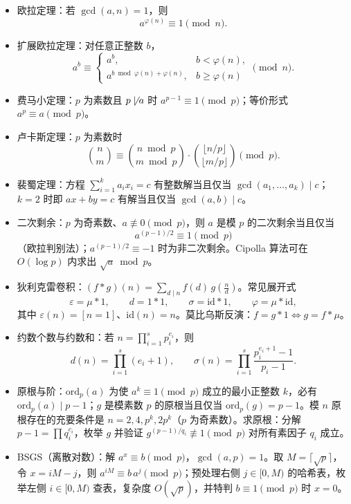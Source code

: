 \documentclass[11pt,a4paper]{ctexart}
\begin{document}
\begin{itemize}
  \item 欧拉定理：若 $\gcd(a,n)=1$，则
  \[a^{\varphi(n)}\equiv 1\pmod n.\]
  \item 扩展欧拉定理：对任意正整数 $b$，
  \[
  a^b\equiv
  \begin{cases}
    a^b, & b<\varphi(n),\\
    a^{b\bmod\varphi(n)+\varphi(n)}, & b\ge\varphi(n)
  \end{cases}
  \pmod n.
  \]
  \item 费马小定理：$p$ 为素数且 $p\not\mid a$ 时 $a^{p-1}\equiv 1\pmod p$；等价形式 $a^p\equiv a\pmod p$。
  \item 卢卡斯定理：$p$ 为素数时
  \[
  \binom{n}{m}\equiv\binom{n\bmod p}{m\bmod p}\cdot\binom{\lfloor n/p\rfloor}{\lfloor m/p\rfloor}\pmod p.
  \]
  \item 裴蜀定理：方程 $\sum_{i=1}^{k}a_ix_i=c$ 有整数解当且仅当 $\gcd(a_1,\dots,a_k)\mid c$；$k=2$ 时即 $ax+by=c$ 有解当且仅当 $\gcd(a,b)\mid c$。
  \item 二次剩余：$p$ 为奇素数、$a\not\equiv 0\pmod p$，则 $a$ 是模 $p$ 的二次剩余当且仅当
  \[a^{(p-1)/2}\equiv 1\pmod p\]
  （欧拉判别法）；$a^{(p-1)/2}\equiv -1$ 时为非二次剩余。Cipolla 算法可在 $O(\log p)$ 内求出 $\sqrt{a}\bmod p$。
  \item 狄利克雷卷积：$(f*g)(n)=\sum_{d\mid n}f(d)\,g\!\left(\frac{n}{d}\right)$。常见展开式
  \[\varepsilon=\mu*1,\qquad d=1*1,\qquad \sigma=\mathrm{id}*1,\qquad \varphi=\mu*\mathrm{id},\]
  其中 $\varepsilon(n)=[n=1]$、$\mathrm{id}(n)=n$。莫比乌斯反演：$f=g*1\iff g=f*\mu$。
  \item 约数个数与约数和：若 $n=\prod_{i=1}^{s}p_i^{e_i}$，则
  \[d(n)=\prod_{i=1}^{s}(e_i+1),\qquad \sigma(n)=\prod_{i=1}^{s}\frac{p_i^{e_i+1}-1}{p_i-1}.\]
  \item 原根与阶：$\mathrm{ord}_p(a)$ 为使 $a^k\equiv 1\pmod p$ 成立的最小正整数 $k$，必有 $\mathrm{ord}_p(a)\mid p-1$；$g$ 是模素数 $p$ 的原根当且仅当 $\mathrm{ord}_p(g)=p-1$。模 $n$ 原根存在的充要条件是 $n=2,4,p^k,2p^k$（$p$ 为奇素数）。求原根：分解 $p-1=\prod q_i^{c_i}$，枚举 $g$ 并验证 $g^{(p-1)/q_i}\not\equiv 1\pmod p$ 对所有素因子 $q_i$ 成立。
  \item BSGS（离散对数）：解 $a^x\equiv b\pmod p$，$\gcd(a,p)=1$。取 $M=\lceil\sqrt p\rceil$，令 $x=iM-j$，则 $a^{iM}\equiv b\,a^{j}\pmod p$；预处理右侧 $j\in[0,M)$ 的哈希表，枚举左侧 $i\in[0,M)$ 查表，复杂度 $O(\sqrt p)$，并特判 $b\equiv 1\pmod p$ 时 $x=0$。
\end{itemize}
\end{document}

